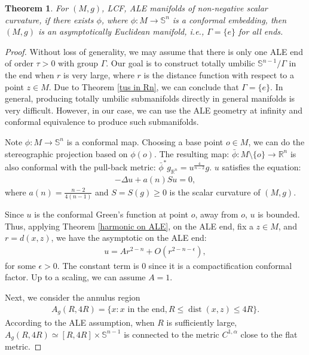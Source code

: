 \documentclass[12pt]{amsart}
\newtheorem{theorem}{Theorem}[section]
\theoremstyle{definition}
\begin{document}
\begin{theorem}
    For $(M,g)$, LCF, ALE manifolds of non-negative scalar curvature, if there exists $\phi$, where $\phi: M \to \mathbb{S}^n$ is a conformal embedding, then $(M,g)$ is an asymptotically Euclidean manifold, i.e., $\Gamma = \{e\}$ for all ends.
\end{theorem}
\begin{proof}
    Without loss of generality, we may assume that there is only one ALE end of order $\tau >0$ with group $\Gamma$. Our goal is to construct totally umbilic $\mathbb{S}^{n-1}/\Gamma$ in the end when $r$ is very large, where $r$ is the distance function with respect to a point $z\in M$. Due to Theorem \ref{tus in Rn}, we can conclude that $\Gamma = \{e\}$. In general, producing totally umbilic submanifolds directly in general manifolds is very difficult. However, in our case, we can use the ALE geometry at infinity and conformal equivalence to produce such submanifolds.

    Note $\phi: M \to \mathbb{S}^n$ is a conformal map. Choosing a base point $o\in M$, we can do the stereographic projection based on $\phi(o)$. The resulting map: $\bar{\phi}:M\setminus\{o\} \to \mathbb{R}^n$ is also conformal with the pull-back metric: $\bar{\phi}^* g_{\mathbb{R}^n} = u^{\frac{4}{n-2}} g$. $u$ satisfies the equation:
    \begin{align*}
        -\Delta u + a(n) S u = 0,
    \end{align*}
    where $a(n) = \frac{n-2}{4(n-1)}$ and $S = S(g)\geq 0$ is the scalar curvature of $(M,g)$.

    Since $u$ is the conformal Green's function at point $o$, away from $o$, $u$ is bounded. Thus, applying Theorem \ref{harmonic on ALE}, on the ALE end, fix a $z\in M$, and $r = d(x,z)$, we have the asymptotic on the ALE end:
    \begin{align*}
        u = Ar^{2-n} + O(r^{2-n-\epsilon}),
    \end{align*}
    for some $\epsilon >0$. The constant term is 0 since it is a compactification conformal factor. Up to a scaling, we can assume $A = 1$.

    Next, we consider the annulus region 
    \begin{align*}
        A_g(R, 4R) = \{x:x\text{ in the end}, R\leq \operatorname{dist}(x,z)\leq 4R\}.
    \end{align*}
    According to the ALE assumption, when $R$ is sufficiently large, $A_g(R,4R) \simeq [R,4R]\times\mathbb{S}^{n-1}$ is connected to the metric $C^{1,\alpha}$ close to the flat metric. 


\end{proof}
\end{document}
